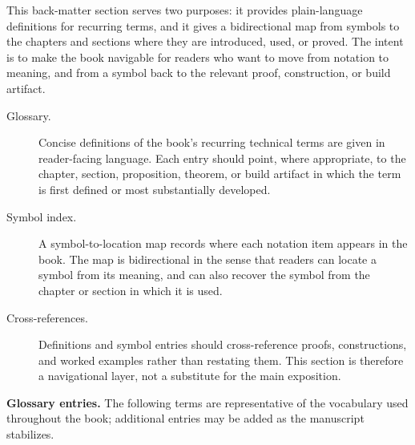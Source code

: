This back-matter section serves two purposes: it provides plain-language definitions for recurring terms, and it gives a bidirectional map from symbols to the chapters and sections where they are introduced, used, or proved. The intent is to make the book navigable for readers who want to move from notation to meaning, and from a symbol back to the relevant proof, construction, or build artifact.

\begin{description}
  \item[Glossary.] Concise definitions of the book's recurring technical terms are given in reader-facing language. Each entry should point, where appropriate, to the chapter, section, proposition, theorem, or build artifact in which the term is first defined or most substantially developed.
  \item[Symbol index.] A symbol-to-location map records where each notation item appears in the book. The map is bidirectional in the sense that readers can locate a symbol from its meaning, and can also recover the symbol from the chapter or section in which it is used.
  \item[Cross-references.] Definitions and symbol entries should cross-reference proofs, constructions, and worked examples rather than restating them. This section is therefore a navigational layer, not a substitute for the main exposition.
\end{description}

\medskip

\noindent\textbf{Glossary entries.} The following terms are representative of the vocabulary used throughout the book; additional entries may be added as the manuscript stabilizes.


